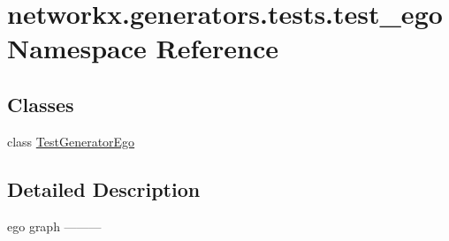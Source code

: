 \hypertarget{namespacenetworkx_1_1generators_1_1tests_1_1test__ego}{}\section{networkx.\+generators.\+tests.\+test\+\_\+ego Namespace Reference}
\label{namespacenetworkx_1_1generators_1_1tests_1_1test__ego}
\subsection*{Classes}
\begin{DoxyCompactItemize}
\item 
class \hyperlink{classnetworkx_1_1generators_1_1tests_1_1test__ego_1_1TestGeneratorEgo}{Test\+Generator\+Ego}
\end{DoxyCompactItemize}


\subsection{Detailed Description}
\begin{DoxyVerb}ego graph
---------
\end{DoxyVerb}
 